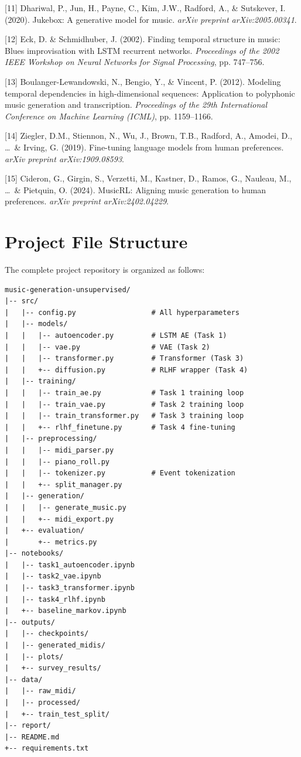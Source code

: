 \documentclass{article}
\begin{document}
{[11] Dhariwal, P., Jun, H., Payne, C., Kim, J.W., Radford, A., \& Sutskever, I. (2020). Jukebox: A generative model for music. \textit{arXiv preprint arXiv:2005.00341}.

[12] Eck, D. \& Schmidhuber, J. (2002). Finding temporal structure in music: Blues improvisation with LSTM recurrent networks. \textit{Proceedings of the 2002 IEEE Workshop on Neural Networks for Signal Processing}, pp. 747--756.

[13] Boulanger-Lewandowski, N., Bengio, Y., \& Vincent, P. (2012). Modeling temporal dependencies in high-dimensional sequences: Application to polyphonic music generation and transcription. \textit{Proceedings of the 29th International Conference on Machine Learning (ICML)}, pp. 1159--1166.

[14] Ziegler, D.M., Stiennon, N., Wu, J., Brown, T.B., Radford, A., Amodei, D., \ldots\ \& Irving, G. (2019). Fine-tuning language models from human preferences. \textit{arXiv preprint arXiv:1909.08593}.

[15] Cideron, G., Girgin, S., Verzetti, M., Kastner, D., Ramos, G., Nauleau, M., \ldots\ \& Pietquin, O. (2024). MusicRL: Aligning music generation to human preferences. \textit{arXiv preprint arXiv:2402.04229}.

}

\appendix

\section{Project File Structure}
\label{app:filestructure}

The complete project repository is organized as follows:

\begin{lstlisting}
music-generation-unsupervised/
|-- src/
|   |-- config.py                  # All hyperparameters
|   |-- models/
|   |   |-- autoencoder.py         # LSTM AE (Task 1)
|   |   |-- vae.py                 # VAE (Task 2)
|   |   |-- transformer.py         # Transformer (Task 3)
|   |   +-- diffusion.py           # RLHF wrapper (Task 4)
|   |-- training/
|   |   |-- train_ae.py            # Task 1 training loop
|   |   |-- train_vae.py           # Task 2 training loop
|   |   |-- train_transformer.py   # Task 3 training loop
|   |   +-- rlhf_finetune.py       # Task 4 fine-tuning
|   |-- preprocessing/
|   |   |-- midi_parser.py
|   |   |-- piano_roll.py
|   |   |-- tokenizer.py           # Event tokenization
|   |   +-- split_manager.py
|   |-- generation/
|   |   |-- generate_music.py
|   |   +-- midi_export.py
|   +-- evaluation/
|       +-- metrics.py
|-- notebooks/
|   |-- task1_autoencoder.ipynb
|   |-- task2_vae.ipynb
|   |-- task3_transformer.ipynb
|   |-- task4_rlhf.ipynb
|   +-- baseline_markov.ipynb
|-- outputs/
|   |-- checkpoints/
|   |-- generated_midis/
|   |-- plots/
|   +-- survey_results/
|-- data/
|   |-- raw_midi/
|   |-- processed/
|   +-- train_test_split/
|-- report/
|-- README.md
+-- requirements.txt
\end{lstlisting}
\end{document}
